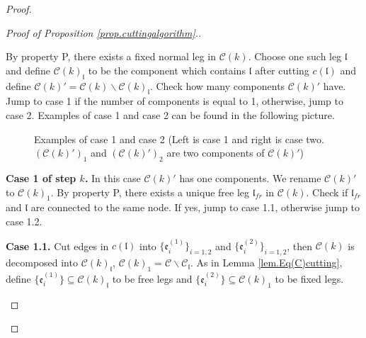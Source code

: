 \begin{proof}
\begin{proof}[Proof of Proposition \ref{prop.cuttingalgorithm}.]
\begin{mdframed}
By property P, there exists a fixed normal leg in $\mathcal{C}(k)$. Choose one such leg $\mathfrak{l}$ and define $\mathcal{C}(k)_{\mathfrak{l}}$ to be the component which contains $\mathfrak{l}$ after cutting $c(\mathfrak{l})$ and define $\mathcal{C}(k)'=\mathcal{C}(k)\backslash \mathcal{C}(k)_{\mathfrak{l}}$. Check how many components $\mathcal{C}(k)'$ have. Jump to case 1 if the number of components is equal to 1, otherwise, jump to case 2. Examples of case 1 and case 2 can be found in the following picture.
\begin{figure}[H]
    \centering
        \caption{Examples of case 1 and case 2 (Left is case 1 and right is case two. $(\mathcal{C}(k)')_1$ and $(\mathcal{C}(k)')_2$ are two components of $\mathcal{C}(k)'$)}
        \label{fig.step1case}
    \end{figure}

\textbf{Case 1 of step $k$.} In this case $\mathcal{C}(k)'$ has one components. We rename  $\mathcal{C}(k)'$ to $\mathcal{C}(k)_1$. By property P, there exists a unique free leg $\mathfrak{l}_{fr}$ in $\mathcal{C}(k)$. Check if $\mathfrak{l}_{fr}$ and $\mathfrak{l}$ are connected to the same node. If yes, jump to case 1.1, otherwise jump to case 1.2.

\textbf{Case 1.1.} Cut edges in $c(\mathfrak{l})$ into $\{\mathfrak{e}_{i}^{(1)}\}_{i=1,2}$ and $\{\mathfrak{e}_{i}^{(2)}\}_{i=1,2}$, then $\mathcal{C}(k)$ is decomposed into $\mathcal{C}(k)_{\mathfrak{l}}$, $\mathcal{C}(k)_1=\mathcal{C}\backslash \mathcal{C}_{\mathfrak{l}}$. As in Lemma \ref{lem.Eq(C)cutting}, define $\{\mathfrak{e}_{i}^{(1)}\}\subseteq \mathcal{C}(k)_{\mathfrak{l}}$ to be free legs and $\{\mathfrak{e}_{i}^{(2)}\}\subseteq \mathcal{C}(k)_1$ to be fixed legs. 


\end{mdframed}
\end{proof}
\end{proof}
